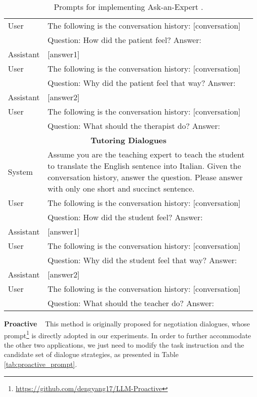 \documentclass{article} %
\begin{document}
\begin{table}[h]
\begin{tabular}{lp{11cm}}
    \midrule
    User    &  The following is the conversation history: [conversation]\\
    & Question: How did the patient feel? Answer:  \\
    \midrule
    Assistant& [answer1] \\
    \midrule
    User    &  The following is the conversation history: [conversation]\\
    & Question: Why did the patient feel that way? Answer:  \\
    \midrule
    Assistant & [answer2] \\
    \midrule
    User    &  The following is the conversation history: [conversation]\\
    & Question: What should the therapist do? Answer:   \\
    \midrule
    \midrule
    \multicolumn{2}{c}{\textbf{Tutoring Dialogues}}\\
    \midrule
    System   &  Assume you are the teaching expert to teach the student to translate the English sentence into Italian. Given the conversation history, answer the question. Please answer with only one short and succinct sentence. \\
    \midrule
    User    &  The following is the conversation history: [conversation]\\
    & Question: How did the student feel? Answer:  \\
    \midrule
    Assistant& [answer1] \\
    \midrule
    User    &  The following is the conversation history: [conversation]\\
    & Question: Why did the student feel that way? Answer:  \\
    \midrule
    Assistant & [answer2] \\
    \midrule
    User    &  The following is the conversation history: [conversation]\\
    & Question: What should the teacher do? Answer:   \\
    \bottomrule
    \end{tabular}
    \caption{Prompts for implementing Ask-an-Expert \citep{acl23-askanexpert}.}
    \label{tab:ane_prompt}
\end{table}

\noindent \textbf{Proactive} \citep{llm-proactive} ~ 
This method is originally proposed for negotiation dialogues, whose prompt\footnote{\url{https://github.com/dengyang17/LLM-Proactive}} is directly adopted in our experiments. 
In order to further accommodate the other two applications, we just need to modify the task instruction and the candidate set of dialogue strategies, as presented in Table \ref{tab:proactive_prompt}. 
\end{document}
